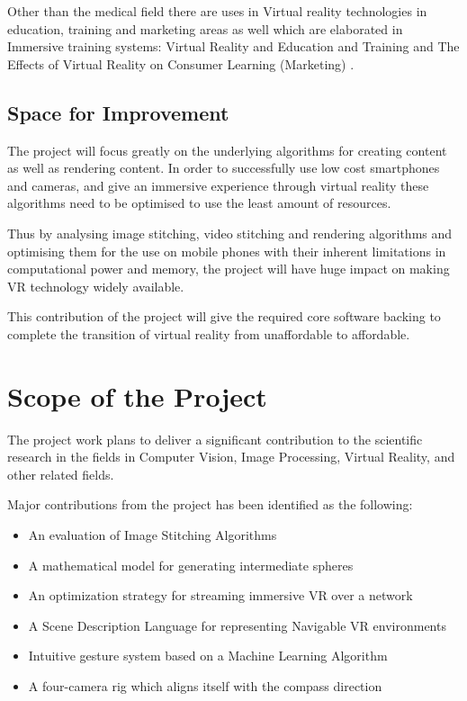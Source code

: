 Other than the medical field there are uses in Virtual reality technologies in education, training and marketing areas as well which are elaborated in Immersive training systems: Virtual Reality and Education and Training \cite{psotka95} and  The Effects of Virtual Reality on Consumer Learning (Marketing) \cite{suh2005}.

\subsection{Space for Improvement}
\label{intro_subsec:2_3}

The project will focus greatly on the underlying algorithms for creating content as well as rendering content. In order to successfully use low cost smartphones and cameras, and give an immersive experience through virtual reality these algorithms need to be optimised to use the least amount of resources.

Thus by analysing image stitching, video stitching and rendering algorithms and optimising them for the use on mobile phones with their inherent limitations in computational power and memory, the project will have huge impact on making VR technology widely available.

This contribution of the project will give the required core software backing to complete the transition of virtual reality from unaffordable to affordable.

\section{Scope of the Project}
\label{intro_sec:3}

The project work plans to deliver a significant contribution to the scientific research in the fields in Computer Vision, Image Processing, Virtual Reality, and other related fields.

Major contributions from the project has been identified as the following:

\begin{itemize}
\item{An evaluation of Image Stitching Algorithms}
\item{A mathematical model for generating intermediate spheres}
\item{An optimization strategy for streaming immersive VR over a network}
\item{A Scene Description Language for representing Navigable VR environments}
\item{Intuitive gesture system based on a Machine Learning Algorithm}
\item{A four-camera rig which aligns itself with the compass direction}
\end{itemize}

